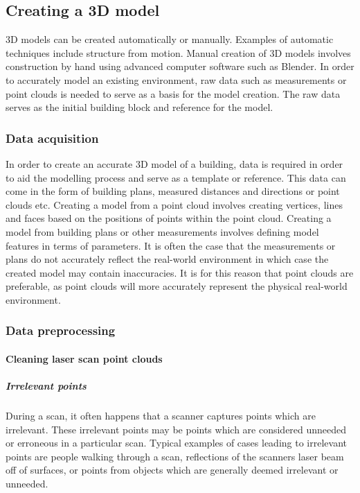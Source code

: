 \documentclass[11pt,a4paper]{report}
\begin{document}
		\subsection{Creating a 3D model}
			3D models can be created automatically or manually. Examples of automatic techniques include structure from motion. Manual creation of 3D models involves construction by hand using advanced computer software such as Blender. 
			In order to accurately model an existing environment, raw data such as measurements or point clouds is needed to serve as a basis for the model creation. The raw data serves as the initial building block and reference for the model.
		
			\subsubsection{Data acquisition}
				In order to create an accurate 3D model of a building, data is required in order to aid the modelling process and serve as a template or reference.
				This data can come in the form of building plans, measured distances and directions or point clouds etc.
				Creating a model from a point cloud involves creating vertices, lines and faces based on the positions of points  within the point cloud.
				Creating a model from building plans or other measurements involves defining model features in terms of parameters. 
				It is often the case that the measurements or plans do not accurately reflect the real-world environment in which case the created model may contain inaccuracies. It is for this reason that point clouds are preferable, as point clouds will more accurately represent the physical real-world environment.
				
			\subsubsection{Data preprocessing}
				\paragraph{Cleaning laser scan point clouds}
					\subparagraph{Irrelevant points}
						During a scan, it often happens that a scanner captures points which are irrelevant. These irrelevant points may be points which are considered unneeded or erroneous in a particular scan. Typical examples of cases leading to irrelevant points are people walking through a scan, reflections of the scanners laser beam off of surfaces, or points from objects which are generally deemed irrelevant or unneeded.
						
\end{document}
